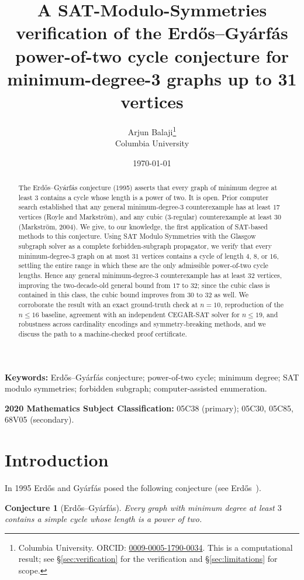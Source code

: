 \documentclass[11pt]{article}
\title{A SAT-Modulo-Symmetries verification of the Erd\H{o}s--Gy\'arf\'as
power-of-two cycle conjecture for minimum-degree-3 graphs up to 31 vertices}
\author{Arjun Balaji\thanks{Columbia University. ORCID:
\href{https://orcid.org/0009-0005-1790-0034}{0009-0005-1790-0034}. This is a
computational result; see \S\ref{sec:verification} for the verification and
\S\ref{sec:limitations} for scope.} \\ Columbia University}
\date{\today}
\newtheorem{conjecture}{Conjecture}
\begin{document}
\maketitle

\begin{abstract}
The Erd\H{o}s--Gy\'arf\'as conjecture (1995) asserts that every graph of minimum
degree at least $3$ contains a cycle whose length is a power of two. It is open.
Prior computer search established that any general minimum-degree-3 counterexample
has at least $17$ vertices (Royle and Markstr\"om), and any cubic (3-regular)
counterexample at least $30$ (Markstr\"om, 2004). We give, to our knowledge, the
first application of SAT-based methods to this conjecture. Using SAT Modulo
Symmetries with the Glasgow subgraph solver as a complete forbidden-subgraph
propagator, we verify that every minimum-degree-3 graph on at most $31$ vertices
contains a cycle of length $4$, $8$, or $16$, settling the entire range in which
these are the only admissible power-of-two cycle lengths. Hence any general
minimum-degree-3 counterexample has at least $32$ vertices, improving the
two-decade-old general bound from $17$ to $32$; since the cubic class is contained
in this class, the cubic bound improves from $30$ to $32$ as well. We corroborate the result with an exact
ground-truth check at $n=10$, reproduction of the $n\le 16$ baseline, agreement with
an independent CEGAR-SAT solver for $n\le 19$, and robustness across cardinality
encodings and symmetry-breaking methods, and we discuss the path to a
machine-checked proof certificate.
\end{abstract}

\medskip
\noindent\textbf{Keywords:} Erd\H{o}s--Gy\'arf\'as conjecture; power-of-two cycle;
minimum degree; SAT modulo symmetries; forbidden subgraph; computer-assisted
enumeration.

\smallskip
\noindent\textbf{2020 Mathematics Subject Classification:}
05C38 (primary); 05C30, 05C85, 68V05 (secondary).

\section{Introduction}
\label{sec:intro}

In 1995 Erd\H{o}s and Gy\'arf\'as posed the following conjecture (see
Erd\H{o}s~\cite{erdos1997}).

\begin{conjecture}[Erd\H{o}s--Gy\'arf\'as]
\label{conj:eg}
Every graph with minimum degree at least $3$ contains a simple cycle whose
length is a power of two.
\end{conjecture}
\end{document}
